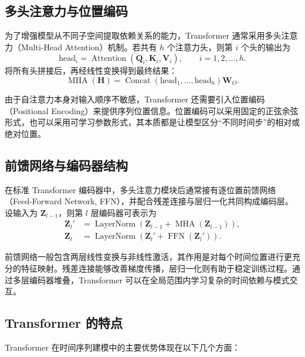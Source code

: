 \subsection{多头注意力与位置编码}

为了增强模型从不同子空间提取依赖关系的能力，Transformer 通常采用多头注意力（Multi-Head Attention）机制。若共有 $h$ 个注意力头，则第 $i$ 个头的输出为
\begin{equation}
    \mathrm{head}_i =
    \operatorname{Attention}(\mathbf{Q}_i, \mathbf{K}_i, \mathbf{V}_i),
    \qquad i=1,2,\ldots,h.
\end{equation}
将所有头拼接后，再经线性变换得到最终结果：
\begin{equation}
    \operatorname{MHA}(\mathbf{H}) =
    \operatorname{Concat}(\mathrm{head}_1,\ldots,\mathrm{head}_h)\mathbf{W}_O.
\end{equation}

由于自注意力本身对输入顺序不敏感，Transformer 还需要引入位置编码（Positional Encoding）来提供序列位置信息。位置编码可以采用固定的正弦余弦形式，也可以采用可学习参数形式，其本质都是让模型区分``不同时间步''的相对或绝对位置。

\subsection{前馈网络与编码器结构}

在标准 Transformer 编码器中，多头注意力模块后通常接有逐位置前馈网络（Feed-Forward Network, FFN），并配合残差连接与层归一化共同构成编码层。设输入为 $\mathbf{Z}_{l-1}$，则第 $l$ 层编码器可表示为
\begin{align}
    \mathbf{Z}_l' &= \operatorname{LayerNorm}\!\left(
        \mathbf{Z}_{l-1} + \operatorname{MHA}(\mathbf{Z}_{l-1})
    \right), \\
    \mathbf{Z}_l &= \operatorname{LayerNorm}\!\left(
        \mathbf{Z}_l' + \operatorname{FFN}(\mathbf{Z}_l')
    \right).
\end{align}

前馈网络一般包含两层线性变换与非线性激活，其作用是对每个时间位置进行更充分的特征映射。残差连接能够改善梯度传播，层归一化则有助于稳定训练过程。通过多层编码器堆叠，Transformer 可以在全局范围内学习复杂的时间依赖与模式交互。

\subsection{Transformer 的特点}

Transformer 在时间序列建模中的主要优势体现在以下几个方面：

